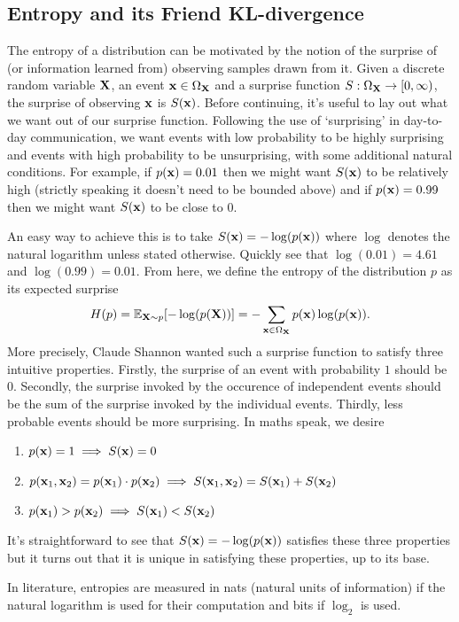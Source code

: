 \documentclass[11pt]{article}
\begin{document}
\begin{appendices}
\subsection{Entropy and its Friend KL-divergence}
\label{app:entropy}

The entropy of a distribution can be motivated by the notion of the surprise of (or information learned from) observing samples drawn from it. Given a discrete random variable $\mathbf{X}$, an event $\mathbf{x}\in\Omega_{\mathbf{X}}$ and a surprise function $S:\Omega_{\mathbf{X}}\rightarrow[0,\infty)$, the surprise of observing $\mathbf{x}$ is $S(\mathbf{x})$. Before continuing, it's useful to lay out what we want out of our surprise function. Following the use of `surprising' in day-to-day communication, we want events with low probability to be highly surprising and events with high probability to be unsurprising, with some additional natural conditions. For example, if $p(\mathbf{x})=0.01$ then we might want $S(\mathbf{x})$ to be relatively high (strictly speaking it doesn't need to be bounded above) and if $p(\mathbf{x})=0.99$ then we might want $S(\mathbf{x})$ to be close to 0.

An easy way to achieve this is to take $S(\mathbf{x})=-\log(p(\mathbf{x}))$ where $\log$ denotes the natural logarithm unless stated otherwise. Quickly see that $\log(0.01)=4.61$ and $\log(0.99)=0.01$. From here, we define the entropy of the distribution $p$ as its expected surprise
$$
H(p)
=
\mathbb{E}_{\mathbf{X}\sim p}[-\log(p(\mathbf{X}))]
=
-\sum_{\mathbf{x}\in \Omega_{\mathbf{X}}}p(\mathbf{x})\log(p(\mathbf{x})).
$$
More precisely, Claude Shannon wanted such a surprise function to satisfy three intuitive properties. Firstly, the surprise of an event with probability $1$ should be $0$. Secondly, the surprise invoked by the occurence of independent events should be the sum of the surprise invoked by the individual events. Thirdly, less probable events should be more surprising. In maths speak, we desire
\begin{enumerate}
    \item $p(\mathbf{x})=1\implies S(\mathbf{x})=0$
    \item $p(\mathbf{x}_1,\mathbf{x}_2)=p(\mathbf{x}_1)\cdot p(\mathbf{x}_2)\implies S(\mathbf{x}_1,\mathbf{x}_2)=S(\mathbf{x}_1)+S(\mathbf{x}_2)$
    \item $p(\mathbf{x}_1)>p(\mathbf{x}_2)\implies S(\mathbf{x}_1)<S(\mathbf{x}_2)$
\end{enumerate}
It's straightforward to see that $S(\mathbf{x})=-\log(p(\mathbf{x}))$ satisfies these three properties but it turns out that it is unique in satisfying these properties, up to its base.

In literature, entropies are measured in nats (natural units of information) if the natural logarithm is used for their computation and bits if $\log_2$ is used.


\end{appendices}
\end{document}
